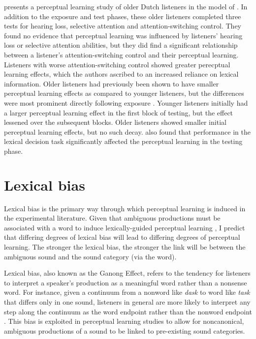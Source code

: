 \citet{Scharenborg2014} presents a perceptual learning study of older Dutch listeners in the model of \citet{Norris2003}.  
In addition to the exposure and test phases, these older listeners completed three tests for hearing loss, selective attention and attention-switching control.  
They found no evidence that perceptual learning was influenced by listeners' hearing loss or selective attention abilities, but they did find a significant relationship between a listener's attention-switching control and their perceptual learning.  
Listeners with worse attention-switching control showed greater perecptual learning effects, which the authors ascribed to an increased reliance on lexical information.  
Older listeners had previously been shown to have smaller perceptual learning effects as compared to younger listeners, but the differences were most prominent directly following exposure \citep{Scharenborg2013}.  
Younger listeners initially had a larger perceptual learning effect in the first block of testing, but the effect lessened over the subsequent blocks.  
Older listeners showed smaller initial perceptual learning effects, but no such decay.  
\citet{Scharenborg2013} also found that performance in the lexical decision task significantly affected the perceptual learning in the testing phase.

\section{Lexical bias}

Lexical bias is the primary way through which perceptual learning is induced in the experimental literature.  Given that ambiguous productions must be associated with a word to induce lexically-guided perceptual learning \citep{Norris2003}, I predict that differing degrees of lexical bias will lead to differing degrees of perceptual learning.  The stronger the lexical bias, the stronger the link will be between the ambiguous sound and the sound category (via the word).


Lexical bias, also known as the Ganong Effect, refers to the tendency for listeners to interpret a speaker's production as a meaningful word rather than a nonsense word.  
For instance, given a continuum from a nonword like \emph{dask} to word like \emph{task} that differs only in one sound, listeners in general are more likely to interpret any step along the continuum as the word endpoint rather than the nonword endpoint \citep{Ganong1980}. 
This bias is exploited in perceptual learning studies to allow for noncanonical, ambiguous productions of a sound to be linked to pre-existing sound categories.

